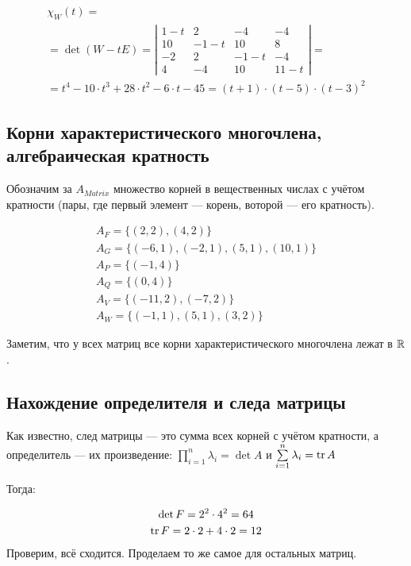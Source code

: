 \documentclass[12pt, a4paper]{article}
\begin{document}
    \begin{multline}
        \chi_W(t) = \\
        = \det (W-tE) = \left|\begin{matrix}
            1-t & 2 & -4 & -4 \\
            10 & -1-t & 10 & 8 \\
            -2 & 2 & -1-t & -4 \\
            4 & -4 & 10 & 11-t
        \end{matrix}\right| = \\
        = t^4-10 \cdot t^3+28 \cdot t^2-6 \cdot t-45=(t+1) \cdot (t-5) \cdot (t-3)^2
    \end{multline}


    \subsection{Корни характеристического многочлена, алгебраическая кратность}

    Обозначим за $A_{Matrix}$ множество корней в вещественных числах с учётом кратности (пары, где первый элемент — корень, воторой — его кратность).

    \begin{gather}
        A_F = \{ (2, 2), (4, 2) \} \\
        A_G = \{ (-6, 1), (-2, 1), (5, 1), (10, 1) \} \\
        A_P = \{ (-1, 4) \} \\
        A_Q = \{ (0, 4) \} \\
        A_V = \{ (-11, 2), (-7, 2) \} \\
        A_W = \{ (-1, 1), (5, 1), (3, 2) \}
    \end{gather}

    Заметим, что у всех матриц все корни характеристического многочлена лежат в ${\mathbb{R}}$.

    \subsection{Нахождение определителя и следа матрицы}

    Как известно, след матрицы — это сумма всех корней с учётом кратности, а определитель — их произведение:
    $\prod\limits_{i=1}^n\lambda_i=\det A$ и $\sum\limits_{i=1}^n\lambda_i=\operatorname{tr} A$

    Тогда:

    \begin{gather}
        \det F = 2^2 \cdot 4^2 = 64 \\
        \operatorname{tr} F = 2 \cdot 2 + 4 \cdot 2 = 12
    \end{gather}
    Проверим, всё сходится. Проделаем то же самое для остальных матриц.
\end{document}
